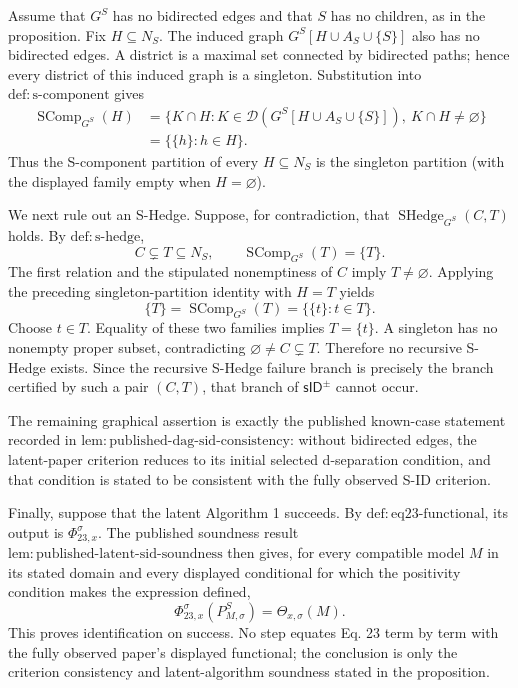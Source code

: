 Assume that \(G^S\) has no bidirected edges and that \(S\) has no children, as in the proposition.  Fix \(H\subseteq N_S\).  The induced graph \(G^S[H\cup A_S\cup\{S\}]\) also has no bidirected edges.  A district is a maximal set connected by bidirected paths; hence every district of this induced graph is a singleton.  Substitution into \(\mathrm{def:s\text{-}component}\) gives
\[
\begin{aligned}
\operatorname{SComp}_{G^S}(H)
&=\bigl\{K\cap H:K\in\mathcal D(G^S[H\cup A_S\cup\{S\}]),\ K\cap H\ne\varnothing\bigr\}\\
&=\bigl\{\{h\}:h\in H\bigr\}.
\end{aligned}
\]
Thus the S-component partition of every \(H\subseteq N_S\) is the singleton partition (with the displayed family empty when \(H=\varnothing\)).

We next rule out an S-Hedge.  Suppose, for contradiction, that \(\operatorname{SHedge}_{G^S}(C,T)\) holds.  By \(\mathrm{def:s\text{-}hedge}\),
\[
C\subsetneq T\subseteq N_S,
\qquad
\operatorname{SComp}_{G^S}(T)=\{T\}.
\]
The first relation and the stipulated nonemptiness of \(C\) imply \(T\ne\varnothing\).  Applying the preceding singleton-partition identity with \(H=T\) yields
\[
\{T\}=\operatorname{SComp}_{G^S}(T)
=\bigl\{\{t\}:t\in T\bigr\}.
\]
Choose \(t\in T\).  Equality of these two families implies \(T=\{t\}\).  A singleton has no nonempty proper subset, contradicting \(\varnothing\ne C\subsetneq T\).  Therefore no recursive S-Hedge exists.  Since the recursive S-Hedge failure branch is precisely the branch certified by such a pair \((C,T)\), that branch of \(\mathsf{sID}^{\pm}\) cannot occur.

The remaining graphical assertion is exactly the published known-case statement recorded in \(\mathrm{lem:published\text{-}dag\text{-}sid\text{-}consistency}\): without bidirected edges, the latent-paper criterion reduces to its initial selected d-separation condition, and that condition is stated to be consistent with the fully observed S-ID criterion.

Finally, suppose that the latent Algorithm 1 succeeds.  By \(\mathrm{def:eq23\text{-}functional}\), its output is \(\Phi_{23,x}^{\sigma}\).  The published soundness result \(\mathrm{lem:published\text{-}latent\text{-}sid\text{-}soundness}\) then gives, for every compatible model \(M\) in its stated domain and every displayed conditional for which the positivity condition makes the expression defined,
\[
\Phi_{23,x}^{\sigma}(P_{M,\sigma}^S)
=\Theta_{x,\sigma}(M).
\]
This proves identification on success.  No step equates Eq. 23 term by term with the fully observed paper's displayed functional; the conclusion is only the criterion consistency and latent-algorithm soundness stated in the proposition.